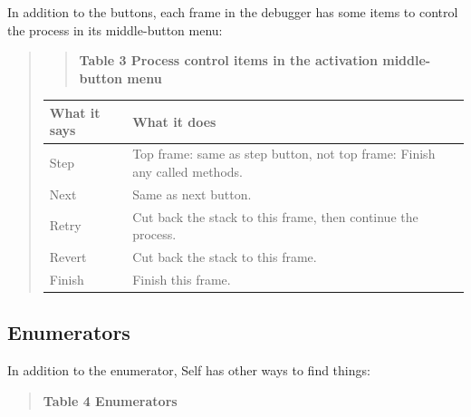 \documentclass[letterpaper,10pt,english]{sphinxmanual}
\begin{document}
In addition to the buttons, each frame in the debugger has some items to control the process in its
middle-button menu:
\begin{quote}
\begin{quote}

\textbf{Table 3 Process control items in the activation middle-button menu}
\end{quote}

\begin{tabulary}{\linewidth}{|L|L|}
\hline
\textbf{
What it says
} & \textbf{
What it does
}\\\hline

Step
 & 
Top frame: same as step button, not top frame: Finish any called methods.
\\\hline

Next
 & 
Same as next button.
\\\hline

Retry
 & 
Cut back the stack to this frame, then continue the process.
\\\hline

Revert
 & 
Cut back the stack to this frame.
\\\hline

Finish
 & 
Finish this frame.
\\\hline
\end{tabulary}

\end{quote}


\subsection{Enumerators}
\label{howtoprg:enumerators}
In addition to the  enumerator, Self has other ways to find things:
\begin{quote}

\textbf{Table 4 Enumerators}
\end{quote}
\end{document}
